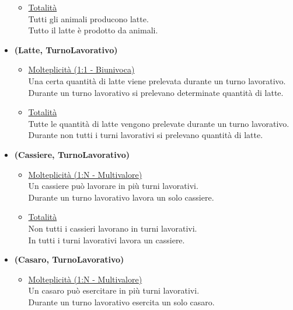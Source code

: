 \documentclass[12pt]{report}
\begin{document}
\begin{itemize}
\begin{itemize}
		\item \underline{Totalità} \\ [2mm]
			Tutti gli animali producono latte.\\
            Tutto il latte è prodotto da animali.\\
	\end{itemize}
	
\item \textbf{(Latte, TurnoLavorativo) }
	\begin{itemize}
		\item \underline{Molteplicità (1:1 - Biunivoca) } \\ [2mm]
			Una certa quantità di latte viene prelevata durante un turno lavorativo.\\
            Durante un turno lavorativo si prelevano determinate quantità di latte.\\

		\item \underline{Totalità} \\ [2mm]
			Tutte le quantità di latte vengono prelevate durante un turno lavorativo.\\
            Durante non tutti i turni lavorativi si prelevano quantità di latte.\\
	\end{itemize}

\item \textbf{(Cassiere, TurnoLavorativo) }
	\begin{itemize}
		\item \underline{Molteplicità (1:N - Multivalore) } \\ [2mm]
			Un cassiere può lavorare in più turni lavorativi.\\
            Durante un turno lavorativo lavora un solo cassiere.\\

		\item \underline{Totalità} \\ [2mm]
			Non tutti i cassieri lavorano in turni lavorativi.\\
            In tutti i turni lavorativi lavora un cassiere.\\
	\end{itemize}

\newpage	

\item \textbf{(Casaro, TurnoLavorativo) }
	\begin{itemize}
		\item \underline{Molteplicità (1:N - Multivalore) } \\ [2mm]
			Un casaro può esercitare in più turni lavorativi.\\
            Durante un turno lavorativo esercita un solo casaro.\\


\end{itemize}
\end{itemize}
\end{document}
